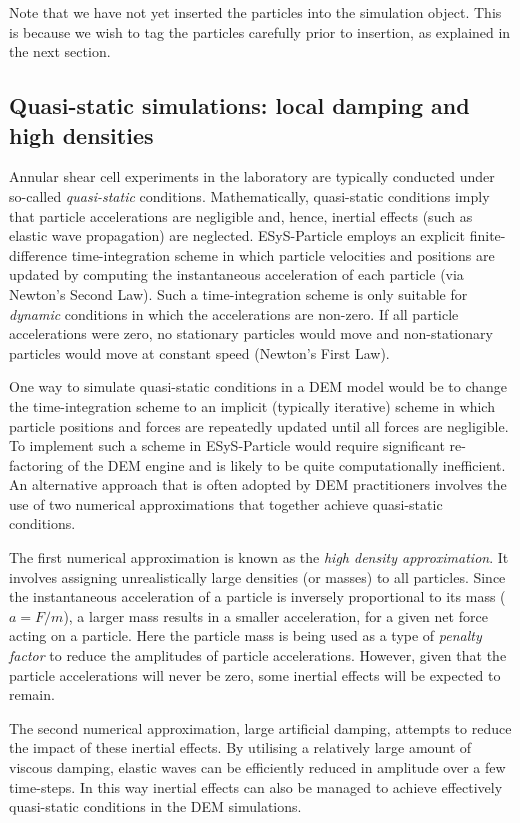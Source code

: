 \noindent
Note that we have not yet inserted the particles into the simulation object. This is because we wish to tag the particles carefully prior to insertion, as explained in the next section.

\subsection{Quasi-static simulations: local damping and high densities}

Annular shear cell experiments in the laboratory are typically conducted under so-called \emph{quasi-static} conditions. Mathematically, quasi-static conditions imply that particle accelerations are negligible and, hence, inertial effects (such as elastic wave propagation) are neglected. ESyS-Particle employs an explicit finite-difference time-integration scheme in which particle velocities and positions are updated by computing the instantaneous acceleration of each particle (via Newton's Second Law). Such a time-integration scheme is only suitable for \emph{dynamic} conditions in which the accelerations are non-zero. If all particle accelerations were zero, no stationary particles would move and non-stationary particles would move at constant speed (Newton's First Law). 

One way to simulate quasi-static conditions in a DEM model would be to change the time-integration scheme to an implicit (typically iterative) scheme in which particle positions and forces are repeatedly updated until all forces are negligible. To implement such a scheme in ESyS-Particle would require significant re-factoring of the DEM engine and is likely to be quite computationally inefficient. An alternative approach that is often adopted by DEM practitioners involves the use of two numerical approximations that together achieve quasi-static conditions. 

The first numerical approximation is known as the \emph{high density approximation}. It involves assigning unrealistically large densities (or masses) to all particles. Since the instantaneous acceleration of a particle is inversely proportional to its mass ($a = F/m$), a larger mass results in a smaller acceleration, for a given net force acting on a particle. Here the particle mass is being used as a type of \emph{penalty factor} to reduce the amplitudes of particle accelerations. However, given that the particle accelerations will never be zero, some inertial effects will be expected to remain. 

The second numerical approximation, large artificial damping, attempts to reduce the impact of these inertial effects. By utilising a relatively large amount of viscous damping, elastic waves can be efficiently reduced in amplitude over a few time-steps. In this way inertial effects can also be managed to achieve effectively quasi-static conditions in the DEM simulations. 


